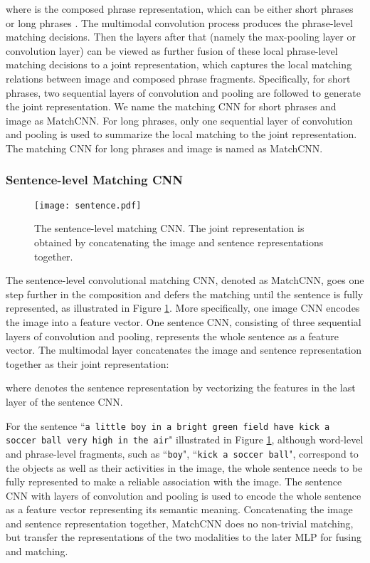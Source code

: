 \documentclass[10pt,twocolumn,letterpaper]{article}
\begin{document}
where  is the composed phrase representation, which can be either short phrases  or long phrases . The multimodal convolution process produces the phrase-level matching decisions. Then the layers after that (namely the max-pooling layer or convolution layer) can be viewed as further fusion of these local phrase-level matching decisions to a  joint representation, which captures the local matching relations between image and composed phrase fragments. Specifically, for short phrases, two sequential layers of convolution and pooling are followed to generate the  joint representation. We name the matching CNN for short phrases and image as MatchCNN. For long phrases, only one sequential layer of convolution and pooling is used to summarize the local matching to the joint representation. The matching CNN for long phrases and image is named as MatchCNN.



\subsubsection{Sentence-level Matching CNN}
\label{sec_sentence}

\begin{figure}[t]
\begin{center}
   \texttt{[image: sentence.pdf]}

\end{center}
   \caption{The sentence-level matching CNN. The joint representation is obtained by concatenating the image and sentence representations together.}
\label{fig:sentence}
\end{figure}


The sentence-level convolutional  matching CNN, denoted as MatchCNN, goes one step further in the composition and defers the matching  until the sentence is fully represented, as illustrated in Figure \ref{fig:sentence}. More specifically, one image CNN encodes the image into a feature vector. One sentence CNN, consisting of three sequential layers of convolution and pooling, represents the whole sentence as a feature vector. The multimodal layer concatenates the image and sentence representation together as their joint representation:

where  denotes the sentence representation by vectorizing the features in the last layer of the sentence CNN.

For the sentence ``\texttt{\small a little boy in a bright green field have kick a soccer ball very high in the air}" illustrated in Figure \ref{fig:sentence}, although word-level and phrase-level fragments, such as ``\texttt{\small boy}", ``\texttt{\small kick a soccer ball}", correspond to the objects  as well as  their activities in the image, the whole sentence needs to be fully represented to make a reliable association with the image. The sentence CNN with layers of convolution and pooling is used to encode the whole sentence as a feature vector representing its semantic meaning. Concatenating the image and sentence representation together,  MatchCNN does no non-trivial matching, but transfer the representations of the two modalities to the later MLP for fusing and matching.
\end{document}
